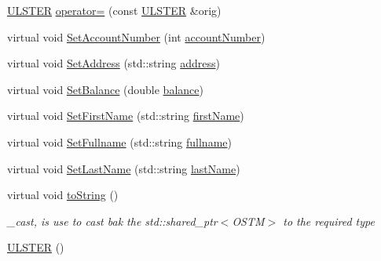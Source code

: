 \begin{DoxyCompactItemize}
\hyperlink{class_u_l_s_t_e_r}{U\+L\+S\+T\+ER} \hyperlink{class_u_l_s_t_e_r_aa096fc13a27cf4c4238af3aad8382a13_aa096fc13a27cf4c4238af3aad8382a13}{operator=} (const \hyperlink{class_u_l_s_t_e_r}{U\+L\+S\+T\+ER} \&orig)
\item 
virtual void \hyperlink{class_u_l_s_t_e_r_ae28bbc54174cd9b3b268d827c122c412_ae28bbc54174cd9b3b268d827c122c412}{Set\+Account\+Number} (int \hyperlink{class_u_l_s_t_e_r_a13f0c2ce30f9e66e896633d81c9af979_a13f0c2ce30f9e66e896633d81c9af979}{account\+Number})
\item 
virtual void \hyperlink{class_u_l_s_t_e_r_a5b0662f0524ce8ce710881a05b431fad_a5b0662f0524ce8ce710881a05b431fad}{Set\+Address} (std\+::string \hyperlink{class_u_l_s_t_e_r_a7a13c5988ddafa47b8d6eea3e77fd786_a7a13c5988ddafa47b8d6eea3e77fd786}{address})
\item 
virtual void \hyperlink{class_u_l_s_t_e_r_a288ded3e96cf65a066f13529db94b182_a288ded3e96cf65a066f13529db94b182}{Set\+Balance} (double \hyperlink{class_u_l_s_t_e_r_af98d3ed41f452b28f26994552465815c_af98d3ed41f452b28f26994552465815c}{balance})
\item 
virtual void \hyperlink{class_u_l_s_t_e_r_a07b57449397c42be1c2b512851dceebd_a07b57449397c42be1c2b512851dceebd}{Set\+First\+Name} (std\+::string \hyperlink{class_u_l_s_t_e_r_af8d138fdca14b59130b8b4ddd3d73b16_af8d138fdca14b59130b8b4ddd3d73b16}{first\+Name})
\item 
virtual void \hyperlink{class_u_l_s_t_e_r_a38d245bc2b6bb14bbb39c3347766140d_a38d245bc2b6bb14bbb39c3347766140d}{Set\+Fullname} (std\+::string \hyperlink{class_u_l_s_t_e_r_a5dc42cbd515825463ba31c8d3dcfe1b6_a5dc42cbd515825463ba31c8d3dcfe1b6}{fullname})
\item 
virtual void \hyperlink{class_u_l_s_t_e_r_ab2fec6b440c29b1953296ad23d4b432c_ab2fec6b440c29b1953296ad23d4b432c}{Set\+Last\+Name} (std\+::string \hyperlink{class_u_l_s_t_e_r_afa319e559a6a7653aa67e6d8f801d7ee_afa319e559a6a7653aa67e6d8f801d7ee}{last\+Name})
\item 
virtual void \hyperlink{class_u_l_s_t_e_r_a341bbcb3f7d6ef10f30d4734ceed10ee_a341bbcb3f7d6ef10f30d4734ceed10ee}{to\+String} ()
\begin{DoxyCompactList}\small\item\em \+\_\+cast, is use to cast bak the std\+::shared\+\_\+ptr$<$\+O\+S\+T\+M$>$ to the required type \end{DoxyCompactList}\item 
\hyperlink{class_u_l_s_t_e_r_a637ad8cb5537167ab51cd079637a8323_a637ad8cb5537167ab51cd079637a8323}{U\+L\+S\+T\+ER} ()

\end{DoxyCompactItemize}
